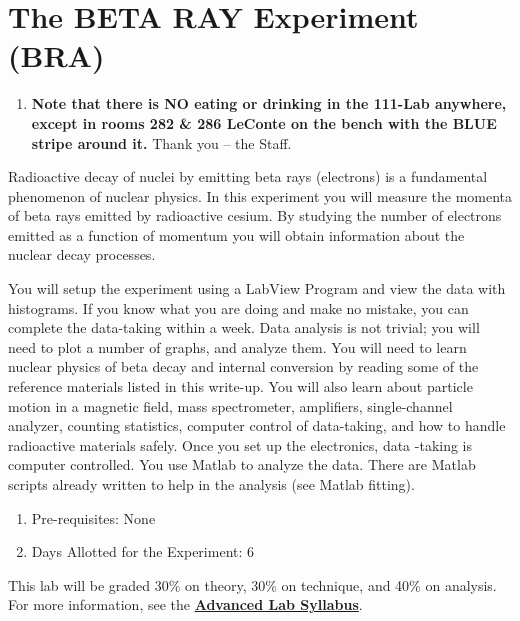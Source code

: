\documentclass{../lab}
\begin{document}
\maketitle

\tableofcontents

\section{The BETA RAY Experiment (BRA)}

\begin{enumerate}
    \item \textbf{Note that there is NO eating or drinking in the 111-Lab anywhere, except in rooms 282 \& 286 LeConte on the bench with the BLUE stripe around it.} Thank you -- the Staff.
\end{enumerate}

Radioactive decay of nuclei by emitting beta rays (electrons) is a fundamental phenomenon of nuclear physics. In this experiment you will measure the momenta of beta rays emitted by radioactive cesium. By studying the number of electrons emitted as a function of momentum you will obtain information about the nuclear decay processes.

You will setup the experiment using a LabView Program and view the data with histograms. If you know what you are doing and make no mistake, you can complete the data-taking within a week. Data analysis is not trivial; you will need to plot a number of graphs, and analyze them. You will need to learn nuclear physics of beta decay and internal conversion by reading some of the reference materials listed in this write-up. You will also learn about particle motion in a magnetic field, mass spectrometer, amplifiers, single-channel analyzer, counting statistics, computer control of data-taking, and how to handle radioactive materials safely. Once you set up the electronics, data -taking is computer controlled. You use Matlab to analyze the data. There are Matlab scripts already written to help in the analysis (see Matlab fitting).

\begin{enumerate}
    \item Pre-requisites: None

    \item Days Allotted for the Experiment: 6
\end{enumerate}

This lab will be graded 30\% on theory, 30\% on technique, and 40\% on analysis. For more information, see the \href{\AdvancedLabSyllabus}{\textbf{Advanced Lab Syllabus}}.
\end{document}

